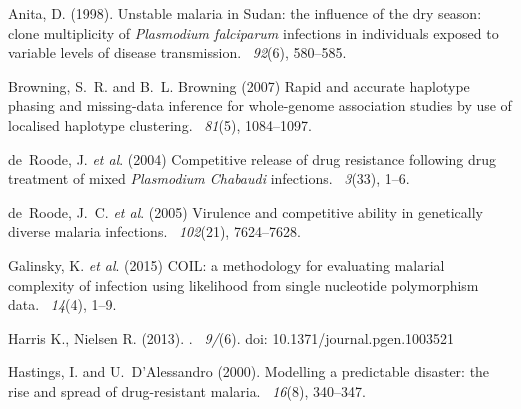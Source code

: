\documentclass{bioinfo}
\begin{document}
\begin{thebibliography}{}

Anita, D. (1998).
\newblock Unstable malaria in Sudan: the influence of the dry season: clone
  multiplicity of {\it Plasmodium falciparum} infections in individuals exposed to
  variable levels of disease transmission.
~{\em 92\/}(6), 580--585.

Browning, S.~R. and B.~L. Browning (2007)
\newblock Rapid and accurate haplotype phasing and missing-data inference for
  whole-genome association studies by use of localised haplotype clustering.
~{\em 81\/}(5), 1084--1097.

de~Roode, J. {\em et al}. (2004)
\newblock Competitive release of drug resistance following drug treatment of
  mixed {\it Plasmodium Chabaudi} infections.
~{\em 3\/}(33), 1--6.

de~Roode, J.~C. {\em et al}. (2005)
\newblock Virulence and competitive ability in genetically diverse malaria
  infections.
~{\em 102\/}(21), 7624--7628.

Galinsky, K. {\em et al}. (2015)
\newblock COIL: a methodology for evaluating malarial complexity of infection using likelihood from single nucleotide polymorphism data.
~{\em14\/}(4), 1--9.

Harris K., Nielsen R. (2013).
.
~{\em9/}(6). doi: 10.1371/journal.pgen.1003521

Hastings, I. and U.~D'Alessandro (2000).
\newblock Modelling a predictable disaster: the rise and spread of
  drug-resistant malaria.
~{\em 16\/}(8), 340--347.


\end{thebibliography}
\end{document}
